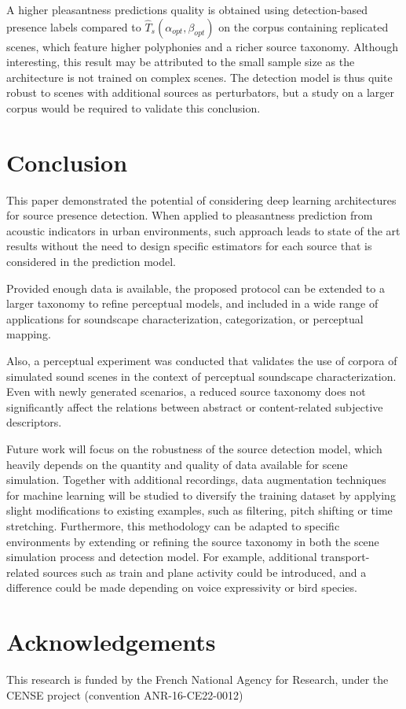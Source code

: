 \documentclass[twocolumn]{article}
\begin{document}
A higher pleasantness predictions quality is obtained using detection-based presence labels compared to $\hat T_s(\alpha_{opt}, \beta_{opt})$ on the corpus containing replicated scenes, which feature higher polyphonies and a richer source taxonomy. Although interesting, this result may be attributed to the small sample size as the architecture is not trained on complex scenes. The detection model is thus quite robust to scenes with additional sources as perturbators, but a study on a larger corpus would be required to validate this conclusion.

\section{Conclusion}
\label{sec:conclusion}

This paper demonstrated the potential of considering deep learning architectures for source presence detection. When applied to pleasantness prediction from acoustic indicators in urban environments, such approach leads to state of the art results without the need to design specific estimators for each source that is considered in the prediction model.

Provided enough data is available, the proposed protocol can be extended to a larger taxonomy to refine perceptual models, and included in a wide range of applications for soundscape characterization, categorization, or perceptual mapping.

Also, a perceptual experiment was conducted that validates the use of corpora of simulated sound scenes in the context of perceptual soundscape characterization. Even with newly generated scenarios, a reduced source taxonomy does not significantly affect the relations between abstract or content-related subjective descriptors.

Future work will focus on the robustness of the source detection model, which heavily depends on the quantity and quality of data available for scene simulation. Together with additional recordings, data augmentation techniques for machine learning will be studied to diversify the training dataset by applying slight modifications to existing examples, such as filtering, pitch shifting or time stretching. Furthermore, this methodology can be adapted to specific environments by extending or refining the source taxonomy in both the scene simulation process and detection model. For example, additional transport-related sources such as train and plane activity could be introduced, and a difference could be made depending on voice expressivity or bird species.

\section*{Acknowledgements}
\label{sec:ack}

This research is funded by the French National Agency for Research, under the CENSE project (convention ANR-16-CE22-0012)




\end{document}
